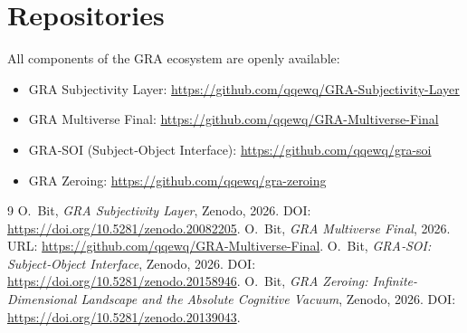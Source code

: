 \documentclass[a4paper,12pt]{article}
\begin{document}
\section*{Repositories}
All components of the GRA ecosystem are openly available:
\begin{itemize}
\item GRA Subjectivity Layer: \url{https://github.com/qqewq/GRA-Subjectivity-Layer}
\item GRA Multiverse Final: \url{https://github.com/qqewq/GRA-Multiverse-Final}
\item GRA‑SOI (Subject‑Object Interface): \url{https://github.com/qqewq/gra-soi}
\item GRA Zeroing: \url{https://github.com/qqewq/gra-zeroing}
\end{itemize}


\begin{thebibliography}{9}
 O.~Bit, \emph{GRA Subjectivity Layer}, Zenodo, 2026. DOI: \url{https://doi.org/10.5281/zenodo.20082205}.
 O.~Bit, \emph{GRA Multiverse Final}, 2026. URL: \url{https://github.com/qqewq/GRA-Multiverse-Final}.
 O.~Bit, \emph{GRA‑SOI: Subject‑Object Interface}, Zenodo, 2026. DOI: \url{https://doi.org/10.5281/zenodo.20158946}.
 O.~Bit, \emph{GRA Zeroing: Infinite-Dimensional Landscape and the Absolute Cognitive Vacuum}, Zenodo, 2026. DOI: \url{https://doi.org/10.5281/zenodo.20139043}.
\end{thebibliography}
\end{document}
